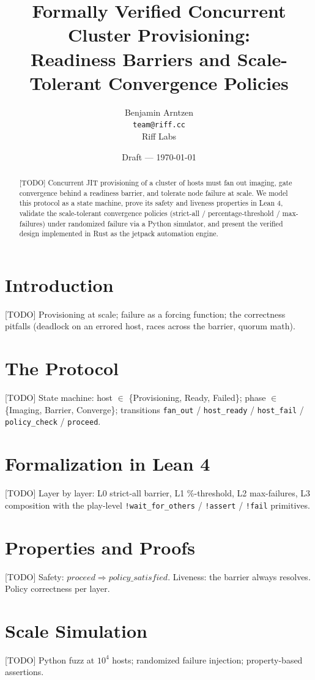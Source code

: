\documentclass[11pt]{article}
\title{Formally Verified Concurrent Cluster Provisioning:\\
Readiness Barriers and Scale-Tolerant Convergence Policies}
\author{Benjamin Arntzen \\ \texttt{team@riff.cc} \\ Riff Labs}
\date{Draft --- \today}
\begin{document}
\maketitle

\begin{abstract}
[TODO] Concurrent JIT provisioning of a cluster of hosts must fan out imaging,
gate convergence behind a readiness barrier, and tolerate node failure at scale.
We model this protocol as a state machine, prove its safety and liveness
properties in Lean 4, validate the scale-tolerant convergence policies
(strict-all / percentage-threshold / max-failures) under randomized failure via a
Python simulator, and present the verified design implemented in Rust as the
jetpack automation engine.
\end{abstract}

\section{Introduction}
[TODO] Provisioning at scale; failure as a forcing function; the correctness
pitfalls (deadlock on an errored host, races across the barrier, quorum math).

\section{The Protocol}
[TODO] State machine: host $\in$ \{Provisioning, Ready, Failed\}; phase $\in$
\{Imaging, Barrier, Converge\}; transitions \texttt{fan\_out} /
\texttt{host\_ready} / \texttt{host\_fail} / \texttt{policy\_check} /
\texttt{proceed}.

\section{Formalization in Lean 4}
[TODO] Layer by layer: L0 strict-all barrier, L1 \%-threshold, L2 max-failures, L3
composition with the play-level \texttt{!wait\_for\_others} /
\texttt{!assert} / \texttt{!fail} primitives.

\section{Properties and Proofs}
[TODO] Safety: $proceed \Rightarrow policy\_satisfied$. Liveness: the barrier
always resolves. Policy correctness per layer.

\section{Scale Simulation}
[TODO] Python fuzz at $10^4$ hosts; randomized failure injection; property-based
assertions.
\end{document}

